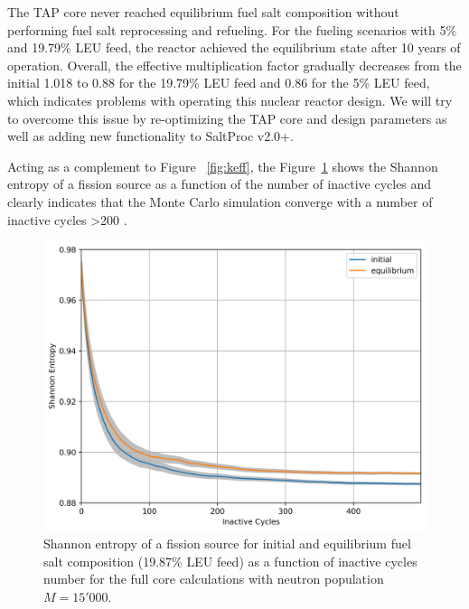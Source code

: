 \documentclass[12pt]{article} %
\begin{document}
The \gls{TAP} core never reached equilibrium fuel salt composition without 
performing fuel salt reprocessing and refueling. For the fueling scenarios 
with 5\% and 19.79\% \gls{LEU} feed, the reactor achieved the equilibrium 
state after 10 years of operation. Overall, the effective multiplication 
factor gradually decreases from the initial 1.018 to 0.88 for the 19.79\% 
\gls{LEU} feed and 0.86 for the 5\% \gls{LEU} feed, which indicates 
problems with operating this nuclear reactor design. We will try to overcome 
this issue by re-optimizing the \gls{TAP} core and design parameters as well 
as adding new functionality to SaltProc v2.0+.

Acting as a complement to Figure ~\ref{fig:keff}, the Figure~\ref{fig:shannon} 
shows the Shannon entropy of a fission source as a function of the number of 
inactive cycles and clearly indicates that the Monte Carlo simulation 
converge with a number of inactive cycles >200 
\cite{brown_k-effective_2011}. 
\begin{figure}[htp!] %
  \centering
		  \includegraphics[width=\textwidth]{h_src.png}
	 \vspace{-0.35in}
  \caption{Shannon entropy of a fission source for initial and equilibrium 
  fuel salt composition (19.87\% \gls{LEU} feed) as a function of inactive 
  cycles number for the full core calculations with neutron population $M=15'000$.}
  \label{fig:shannon}
\end{figure}
\end{document}
